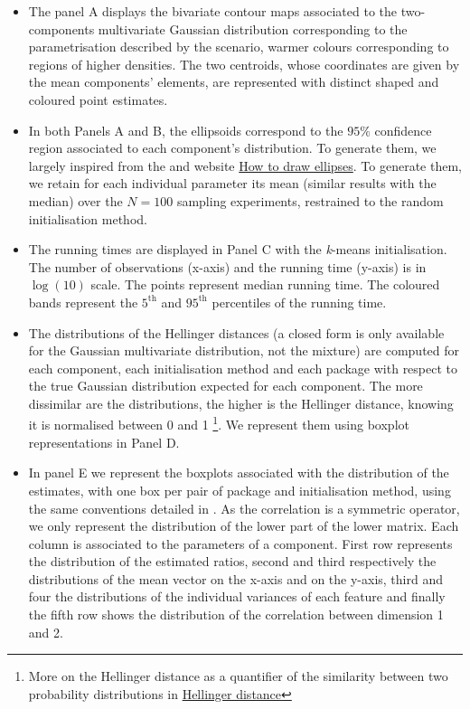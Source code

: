\begin{itemize}
\item The panel A displays the bivariate contour maps associated to the two-components multivariate Gaussian distribution corresponding to the parametrisation described by the scenario, warmer colours corresponding to regions of higher densities. The two centroids, whose coordinates are given by the mean components' elements, are represented with distinct shaped and coloured point estimates.
\item In both Panels A and B, the ellipsoids correspond to the $95\%$ confidence region associated to each component's distribution. To generate them, we largely inspired from the  and website \href{https://cookierobotics.com/007/}{How to draw ellipses}. To generate them, we retain for each individual parameter its mean (similar results with the median) over the $N=100$ sampling experiments, restrained to the random initialisation method.
\item The running times are displayed in Panel C with the \textit{k}-means initialisation. The number of observations
(x-axis) and the running time (y-axis) is in $\log(10)$ scale. The points represent median
running time. The coloured bands represent the $5^{\text{th}}$ and $95^{\text{th}}$ percentiles
of the running time.
\item The distributions of the Hellinger distances (a closed form is only available for the Gaussian multivariate distribution, not the mixture) are computed for each component, each initialisation method and each package with respect to the true Gaussian distribution expected for each component. The more dissimilar are the distributions, the higher is the Hellinger distance, knowing it is normalised between 0 and 1 \footnote{More on the Hellinger distance as a quantifier of the similarity between two probability distributions in \href{https://en.wikipedia.org/wiki/Hellinger_distance}{Hellinger distance}}. We represent them using boxplot representations in Panel D.
\item In panel E we represent the boxplots associated with the distribution of the estimates, with one box per pair of package and initialisation method, using the same conventions detailed in . As the correlation is a symmetric operator, we only represent the distribution of the lower part of the lower matrix. Each column is associated to the parameters of a component. First row represents the distribution of the estimated ratios, second and third respectively the distributions of the mean vector on the x-axis and on the y-axis, third and four the distributions of the individual variances of each feature and finally the fifth row shows the distribution of the correlation between dimension 1 and 2.
\end{itemize}


